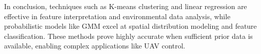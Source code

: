 In conclusion, techniques such as K-means clustering and linear regression are effective in feature interpretation and environmental data analysis, while probabilistic models like GMM excel at spatial distribution modeling and feature classification. These methods prove highly accurate when sufficient prior data is available, enabling complex applications like UAV control.
















    
    
    
    


    

